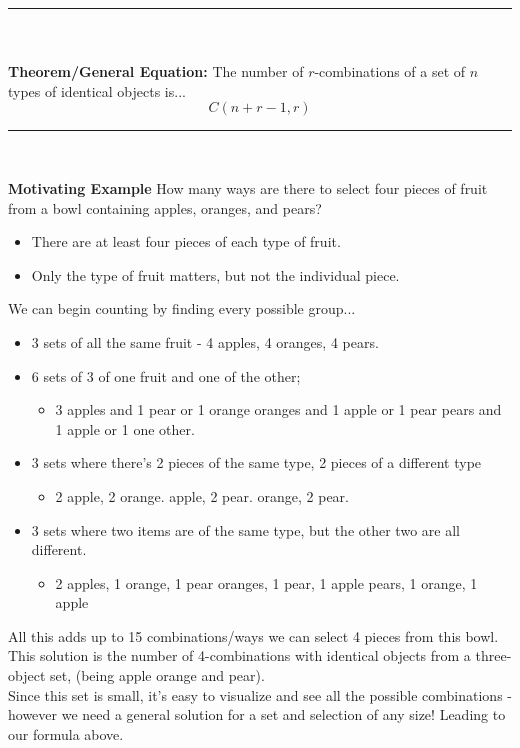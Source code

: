 \documentclass[12pt, letterpaper]{article}
\newcommand{\horizline}[0]{\noindent\rule{\textwidth}{1pt}\\}
\begin{document}
\horizline \vspace*{-0.5cm} \\
\textbf{Theorem/General Equation:} The number of $r$-combinations of a set of $n$ types of identical objects is... \[  C(n+r - 1, r) \]
\vspace*{-0.5cm} \horizline \vspace*{-0.05cm}

\textbf{Motivating Example}
How many ways are there to select four pieces of fruit from a bowl containing apples, oranges, and pears?
\begin{itemize}[leftmargin=*,  label={}]
	\item There are at least four pieces of each type of fruit.
	\item Only the type of fruit matters, but not the individual piece.
\end{itemize}

We can begin counting by finding every possible group... 
{\tiny 
\begin{itemize}[leftmargin=*,  label={}]
	\item 3 sets of all the same fruit - 4 apples, 4 oranges, 4 pears. 
	\item 6 sets of 3 of one fruit and one of the other;
	\begin{itemize}
		\item 3 apples and 1 pear or 1 orange \quad {} oranges and 1 apple or 1 pear \quad {} pears and 1 apple or 1 one other.
	\end{itemize}
	\item 3 sets where there's 2 pieces of the same type, 2 pieces of a different type
	\begin{itemize}
		\item 2 apple, 2 orange. \quad {} apple, 2 pear. \quad {} orange, 2 pear.  
	\end{itemize}
	\item 3 sets where two items are of the same type, but the other two are all different. 
	\begin{itemize}
		\item 2 apples, 1 orange, 1 pear \quad {} oranges, 1 pear, 1 apple  \quad {} pears, 1 orange, 1 apple
	\end{itemize}
\end{itemize}
}
All this adds up to 15 combinations/ways we can select 4 pieces from this bowl. \\ 
This solution is the number of 4-combinations with identical objects from a three-object set, (being apple orange and pear). \\ 
Since this set is small, it's easy to visualize and see all the possible combinations - however we need a general solution for a set and selection of any size! Leading to our formula above.
\end{document}
